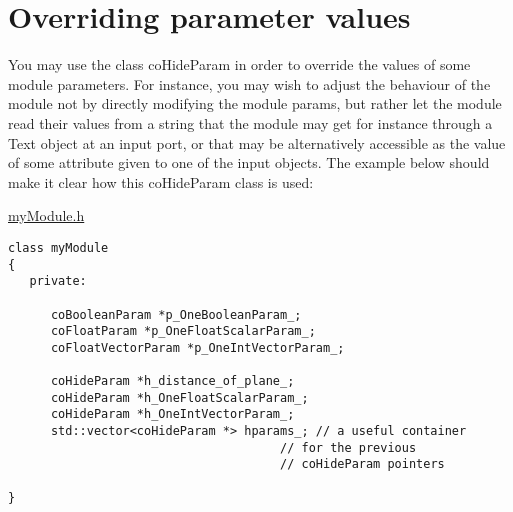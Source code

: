 %
%
%
%

\section{Overriding parameter values}

You may use the class coHideParam in order to override the values of
some module parameters. For instance, you may wish to adjust the behaviour
of the module not by directly modifying the module params, but rather
let the module read their values from a string that the module
may get for instance through a Text object at an input port,
or that may be alternatively accessible as the value of some
attribute given to one of the input objects. The example below
should make it clear how this coHideParam class is used:

\underline{myModule.h}

\begin{verbatim}
class myModule
{
   private:

      coBooleanParam *p_OneBooleanParam_;
      coFloatParam *p_OneFloatScalarParam_;
      coFloatVectorParam *p_OneIntVectorParam_;

      coHideParam *h_distance_of_plane_;
      coHideParam *h_OneFloatScalarParam_;
      coHideParam *h_OneIntVectorParam_;
      std::vector<coHideParam *> hparams_; // a useful container 
                                      // for the previous
                                      // coHideParam pointers
   
}
\end{verbatim}

